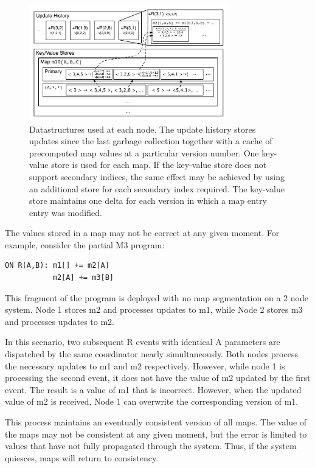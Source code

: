 \documentclass{vldb}
\begin{document}
\begin{figure}
\begin{center}
\includegraphics[width=3.4in]{graphics/Datastructures}
\caption{Datastructures used at each node.  The update history stores updates since the last garbage collection together with a cache of precomputed map values at a particular version number.  One key-value store is used for each map.  If the key-value store does not support secondary indices, the same effect may be achieved by using an additional store for each secondary index required.  The key-value store maintains one delta for each version in which a map entry entry was modified.}
\label{fig:datastructures}
\end{center}
\end{figure}

The values stored in a map may not be correct at any given moment.  For example, consider the partial M3 program:
\begin{verbatim}
ON R(A,B): m1[] += m2[A]
           m2[A] += m3[B]
\end{verbatim}
This fragment of the program is deployed with no map segmentation on a 2 node system.  Node 1 stores m2 and processes updates to m1, while Node 2 stores m3 and processes updates to m2.  

In this scenario, two subsequent R events with identical A parameters are dispatched by the same coordinator nearly simultaneously.  Both nodes process the necessary updates to m1 and m2 respectively.  However, while node 1 is processing the second event, it does not have the value of m2 updated by the first event.  The result is a value of m1 that is incorrect.  However, when the updated value of m2 is received, Node 1 can overwrite the corresponding version of m1.  

This process maintains an eventually consistent version of all maps.  The value of the maps may not be consistent at any given moment, but the error is limited to values that have not fully propagated through the system.  Thus, if the system quiesces, maps will return to consistency.
\end{document}
